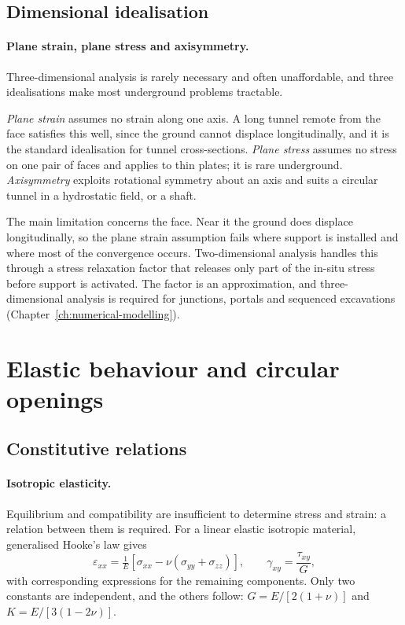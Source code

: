 \subsection{Dimensional idealisation}
\label{sec:plane-idealisations}

\paragraph{Plane strain, plane stress and axisymmetry.}
Three-dimensional analysis is rarely necessary and often unaffordable, and
three idealisations make most underground problems tractable.

\emph{Plane strain} assumes no strain along one axis. A long tunnel remote
from the face satisfies this well, since the ground cannot displace
longitudinally, and it is the standard idealisation for tunnel cross-sections.
\emph{Plane stress} assumes no stress on one pair of faces and applies to thin
plates; it is rare underground. \emph{Axisymmetry} exploits rotational
symmetry about an axis and suits a circular tunnel in a hydrostatic field, or
a shaft.

The main limitation concerns the face. Near it the ground does displace
longitudinally, so the plane strain assumption fails where support is
installed and where most of the convergence occurs. Two-dimensional analysis
handles this through a stress relaxation factor that releases only part of the
in-situ stress before support is activated. The factor is an approximation,
and three-dimensional analysis is required for junctions, portals and
sequenced excavations (Chapter~\ref{ch:numerical-modelling}).

\section{Elastic behaviour and circular openings}
\label{sec:constitutive-behaviour}

\subsection{Constitutive relations}
\label{sec:constitutive-relations}

\paragraph{Isotropic elasticity.}
Equilibrium and compatibility are insufficient to determine stress and strain:
a relation between them is required. For a linear elastic isotropic material,
generalised Hooke's law gives
\[
\varepsilon_{xx} = \tfrac{1}{E}\left[\sigma_{xx} - \nu(\sigma_{yy}+\sigma_{zz})\right],
\qquad
\gamma_{xy} = \frac{\tau_{xy}}{G},
\]
with corresponding expressions for the remaining components. Only two
constants are independent, and the others follow:
$G = E/[2(1+\nu)]$ and $K = E/[3(1-2\nu)]$.

